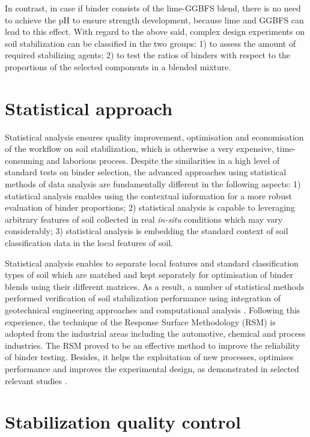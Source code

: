 \documentclass[eprint,
]{actapoly}
\begin{document}
In contrast, in case if binder consists of the lime-GGBFS blend, there is no need to achieve the pH to ensure strength development, because lime and GGBFS can lead to this effect. With regard to the above said, complex design experiments on soil stabilization can be classified in the two groups: 1) to assess the amount of required stabilizing agents; 2) to test the ratios of binders with respect to the proportions of the selected components in a blended mixture. 

\section{Statistical approach}
Statistical analysis ensures quality improvement, optimisation and economisation of the workflow on soil stabilization, which is otherwise a very expensive, time-consuming and laborious process. Despite the similarities in a high level of standard tests on binder selection, the advanced approaches using statistical methods of data analysis are fundamentally different in the following aspects: 1) statistical analysis enables using the contextual information for a more robust evaluation of binder proportions; 2) statistical analysis is capable to leveraging arbitrary features of soil collected in real \emph{in-situ} conditions which may vary considerably; 3) statistical analysis is embedding the standard context of soil classification data in the local features of soil. 

Statistical analysis enables to separate local features and standard classification types of soil which are matched and kept separately for optimisation of binder blends using their different matrices. As a result, a number of statistical methods performed verification of soil stabilization performance using integration of geotechnical engineering approaches and computational analysis \citep{Eissaetal2022,ORourke,Najjar,Kallenetal2016,Ojo,Lindh2021a}. Following this experience, the technique of the Response Surface Methodology (RSM) is adopted from the industrial areas including the automotive, chemical and process industries. The RSM proved to be an effective method to improve the reliability of binder testing. Besides, it helps the exploitation of new processes, optimises performance and improves the experimental design, as demonstrated in selected relevant studies \citep{SUBHA2017285,BIAN2021116745,Myres,CHEN2022125723}.

\section{Stabilization quality control}
\end{document}
